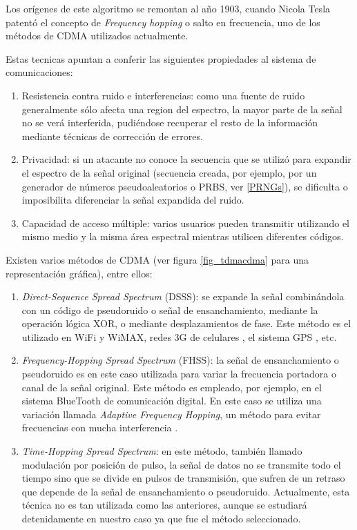 Los orígenes de este algoritmo se remontan al año 1903, cuando Nicola Tesla patentó el concepto de \textit{Frequency hopping} o salto en frecuencia, uno de los métodos de CDMA utilizados actualmente.

Estas tecnicas apuntan a conferir las siguientes propiedades al sistema de comunicaciones:
\begin{enumerate} 
\item Resistencia contra ruido e interferencias: como una fuente de ruido generalmente sólo afecta una region del espectro, la mayor parte de la señal no se verá interferida, pudiéndose recuperar el resto de la información mediante técnicas de corrección de errores.
\item Privacidad: si un atacante no conoce la secuencia que se utilizó para expandir el espectro de la señal original (secuencia creada, por ejemplo, por un generador de números pseudoaleatorios o PRBS, ver \ref{PRNGs}), se dificulta o imposibilita diferenciar la señal expandida del ruido.
\item Capacidad de acceso múltiple: varios usuarios pueden transmitir utilizando el mismo medio y la misma área espectral mientras utilicen diferentes códigos.
\end{enumerate} 

Existen varios métodos de CDMA (ver figura \ref{fig_tdmacdma} para una representación gráfica), entre ellos:
\begin{enumerate} 
\item \textit{Direct-Sequence Spread Spectrum} (DSSS): se expande la señal combinándola con un código de pseudoruido o señal de ensanchamiento, mediante la operación lógica XOR, o mediante desplazamientos de fase. Este método es el utilizado en WiFi y WiMAX, redes 3G de celulares \cite{dixon1994spread}, el sistema GPS \cite{kaplan2005understanding}, etc.
\item \textit{Frequency-Hopping Spread Spectrum} (FHSS): la señal de ensanchamiento o pseudoruido es en este caso utilizada para variar la frecuencia portadora o canal de la señal original. Este método es empleado, por ejemplo, en el sistema BlueTooth de comunicación digital. En este caso se utiliza una variación llamada \textit{Adaptive Frequency Hopping}, un método para evitar frecuencias con mucha interferencia \cite{golmie2003bluetooth}.
\item \textit{Time-Hopping Spread Spectrum}: en este método, también llamado modulación por posición de pulso, la señal de datos no se transmite todo el tiempo sino que se divide en pulsos de transmisión, que sufren de un retraso que depende de la señal de ensanchamiento o pseudoruido. Actualmente, esta técnica no es tan utilizada como las anteriores, aunque se estudiará detenidamente en nuestro caso ya que fue el método seleccionado.
\end{enumerate} 

